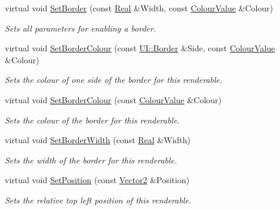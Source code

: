 \begin{DoxyCompactItemize}
virtual void \hyperlink{classMezzanine_1_1UI_1_1Rectangle_a7a5309d467b85191c6f9ff82ab09a136}{SetBorder} (const \hyperlink{namespaceMezzanine_a726731b1a7df72bf3583e4a97282c6f6}{Real} \&Width, const \hyperlink{classMezzanine_1_1ColourValue}{ColourValue} \&Colour)
\begin{DoxyCompactList}\small\item\em Sets all parameters for enabling a border. \item\end{DoxyCompactList}\item 
virtual void \hyperlink{classMezzanine_1_1UI_1_1Rectangle_abd6a232787fe71303ea2f567f210657f}{SetBorderColour} (const \hyperlink{namespaceMezzanine_1_1UI_a060de8b459e4991f4a1627166079c406}{UI::Border} \&Side, const \hyperlink{classMezzanine_1_1ColourValue}{ColourValue} \&Colour)
\begin{DoxyCompactList}\small\item\em Sets the colour of one side of the border for this renderable. \item\end{DoxyCompactList}\item 
virtual void \hyperlink{classMezzanine_1_1UI_1_1Rectangle_a8ef6d94b2d5a0bb933102026c8bea565}{SetBorderColour} (const \hyperlink{classMezzanine_1_1ColourValue}{ColourValue} \&Colour)
\begin{DoxyCompactList}\small\item\em Sets the colour of the border for this renderable. \item\end{DoxyCompactList}\item 
virtual void \hyperlink{classMezzanine_1_1UI_1_1Rectangle_a25420a995854de81d7cd16be403141a7}{SetBorderWidth} (const \hyperlink{namespaceMezzanine_a726731b1a7df72bf3583e4a97282c6f6}{Real} \&Width)
\begin{DoxyCompactList}\small\item\em Sets the width of the border for this renderable. \item\end{DoxyCompactList}\item 
virtual void \hyperlink{classMezzanine_1_1UI_1_1Rectangle_a95511f0a8505f07892434bdc363a7674}{SetPosition} (const \hyperlink{classMezzanine_1_1Vector2}{Vector2} \&Position)
\begin{DoxyCompactList}\small\item\em Sets the relative top left position of this renderable. \item\end{DoxyCompactList}\item 

\end{DoxyCompactItemize}
